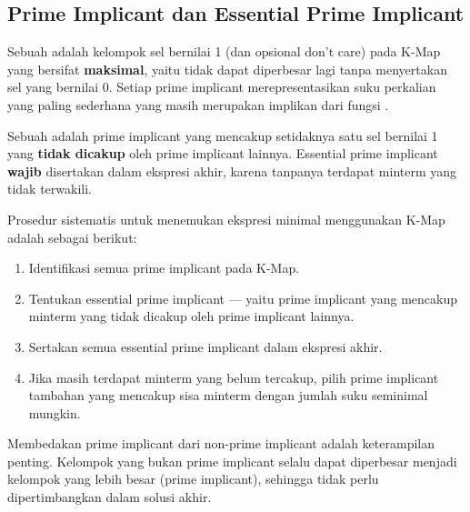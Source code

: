 \subsection{Prime Implicant dan Essential Prime Implicant}

\begin{definisi}
Sebuah  adalah kelompok sel bernilai 1 (dan opsional don't care) pada K-Map yang bersifat \textbf{maksimal}, yaitu tidak dapat diperbesar lagi tanpa menyertakan sel yang bernilai 0. Setiap prime implicant merepresentasikan suku perkalian yang paling sederhana yang masih merupakan implikan dari fungsi \cite{rosen2019}.
\end{definisi}

\begin{definisi}
Sebuah  adalah prime implicant yang mencakup setidaknya satu sel bernilai 1 yang \textbf{tidak dicakup} oleh prime implicant lainnya. Essential prime implicant \textbf{wajib} disertakan dalam ekspresi akhir, karena tanpanya terdapat minterm yang tidak terwakili.
\end{definisi}

Prosedur sistematis untuk menemukan ekspresi minimal menggunakan K-Map adalah sebagai berikut:

\begin{enumerate}
  \item Identifikasi semua prime implicant pada K-Map.
  \item Tentukan essential prime implicant --- yaitu prime implicant yang mencakup minterm yang tidak dicakup oleh prime implicant lainnya.
  \item Sertakan semua essential prime implicant dalam ekspresi akhir.
  \item Jika masih terdapat minterm yang belum tercakup, pilih prime implicant tambahan yang mencakup sisa minterm dengan jumlah suku seminimal mungkin.
\end{enumerate}

\begin{catatan}
Membedakan prime implicant dari non-prime implicant adalah keterampilan penting. Kelompok yang bukan prime implicant selalu dapat diperbesar menjadi kelompok yang lebih besar (prime implicant), sehingga tidak perlu dipertimbangkan dalam solusi akhir.
\end{catatan}
